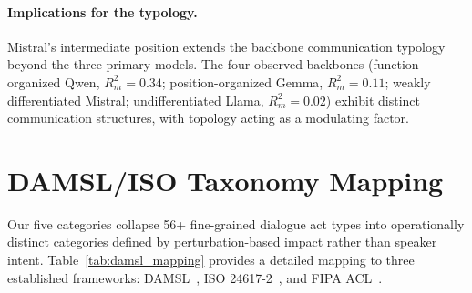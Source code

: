 \paragraph{Implications for the typology.} Mistral's intermediate position extends the backbone communication typology beyond the three primary models. The four observed backbones (function-organized Qwen, $R^2_m = 0.34$; position-organized Gemma, $R^2_m = 0.11$; weakly differentiated Mistral; undifferentiated Llama, $R^2_m = 0.02$) exhibit distinct communication structures, with topology acting as a modulating factor.

\section{DAMSL/ISO Taxonomy Mapping}
\label{app:damsl-mapping}

Our five categories collapse 56+ fine-grained dialogue act types into operationally distinct categories defined by perturbation-based impact rather than speaker intent. Table~\ref{tab:damsl_mapping} provides a detailed mapping to three established frameworks: DAMSL~\citep{core_damsl_1997}, ISO 24617-2~\citep{bunt_iso_2012}, and FIPA ACL~\citep{fipa_acl_2002}.

\begin{table}[ht]
\centering
\caption{Mapping between our communication function taxonomy and established dialogue act frameworks. Each row shows the primary corresponding categories and the key distinction that motivates our grouping.}
\label{tab:damsl_mapping}
\footnotesize
{}%
\end{table}


